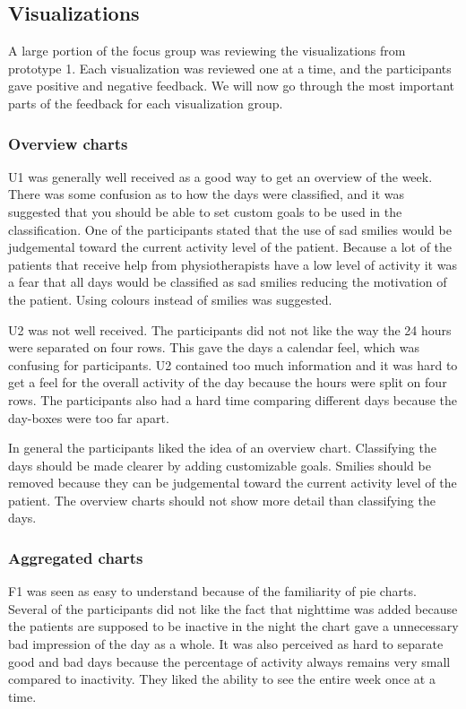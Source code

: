 \subsection{Visualizations}
A large portion of the focus group was reviewing the visualizations from prototype 1. Each visualization was reviewed one at a time, and the participants gave positive and negative feedback. We will now go through the most important parts of the feedback for each visualization group.

\subsubsection{Overview charts}
U1 was generally well received as a good way to get an overview of the week. There was some confusion as to how the days were classified, and it was suggested that you should be able to set custom goals to be used in the classification. One of the participants stated that the use of sad smilies would be judgemental toward the current activity level of the patient. Because a lot of the patients that receive help from physiotherapists have a low level of activity it was a fear that all days would be classified as sad smilies reducing the motivation of the patient. Using colours instead of smilies was suggested.

U2 was not well received. The participants did not not like the way the 24 hours were separated on four rows. This gave the days a calendar feel, which was confusing for participants. U2 contained too much information and it was hard to get a feel for the overall activity of the day because the hours were split on four rows. The participants also had a hard time comparing different days because the day-boxes were too far apart.

In general the participants liked the idea of an overview chart. Classifying the days should be made clearer by adding customizable goals. Smilies should be removed because they can be judgemental toward the current activity level of the patient. The overview charts should not show more detail than classifying the days.

\subsubsection{Aggregated charts}
F1 was seen as easy to understand because of the familiarity of pie charts. Several of the participants did not like the fact that nighttime was added because the patients are supposed to be inactive in the night the chart gave a unnecessary bad impression of the day as a whole. It was also perceived as hard to separate good and bad days because the percentage of activity always remains very small compared to inactivity. They liked the ability to see the entire week once at a time.

